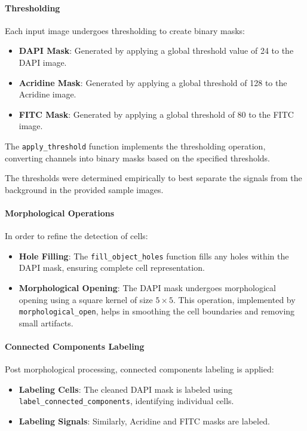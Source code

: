 \documentclass[a4paper,12pt]{article}
\begin{document}
\paragraph{Thresholding}

Each input image undergoes thresholding to create binary masks:
\begin{itemize}
    \item \textbf{DAPI Mask}: Generated by applying a global threshold value of 24 to the DAPI image.
    \item \textbf{Acridine Mask}: Generated by applying a global threshold of 128 to the Acridine image.
    \item \textbf{FITC Mask}: Generated by applying a global threshold of 80 to the FITC image.
\end{itemize}
The \texttt{apply\_threshold} function implements the thresholding operation, converting channels into binary masks based on the specified thresholds.

The thresholds were determined empirically to best separate the signals from the background in the provided sample images.

\paragraph{Morphological Operations}

In order to refine the detection of cells:
\begin{itemize}
    \item \textbf{Hole Filling}: The \texttt{fill\_object\_holes} function fills any holes within the DAPI mask, ensuring complete cell representation.
    \item \textbf{Morphological Opening}: The DAPI mask undergoes morphological opening using a square kernel of size \(5 \times 5\). This operation, implemented by \texttt{morphological\_open}, helps in smoothing the cell boundaries and removing small artifacts.
\end{itemize}

\paragraph{Connected Components Labeling}

Post morphological processing, connected components labeling is applied:
\begin{itemize}
    \item \textbf{Labeling Cells}: The cleaned DAPI mask is labeled using \texttt{label\_connected\_components}, identifying individual cells.
    \item \textbf{Labeling Signals}: Similarly, Acridine and FITC masks are labeled.
\end{itemize}
\end{document}
